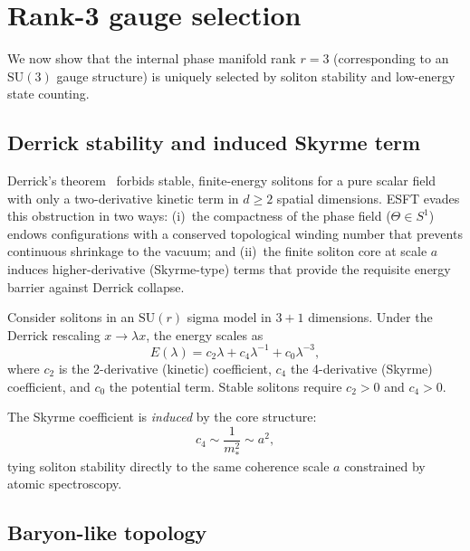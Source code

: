 ﻿\documentclass[a4paper,12pt]{article}
\begin{document}
\section{Rank-3 gauge selection}
\label{sec:rank3}

We now show that the internal phase manifold rank $r=3$ (corresponding
to an $\mathrm{SU}(3)$ gauge structure) is uniquely selected by soliton
stability and low-energy state counting.

\subsection{Derrick stability and induced Skyrme term}

Derrick's theorem~\cite{Derrick1964} forbids stable, finite-energy solitons for a pure scalar field with only a two-derivative kinetic term in $d\geq 2$ spatial dimensions.
ESFT evades this obstruction in two ways: (i)~the compactness of the phase field ($\Theta\in S^1$) endows configurations with a conserved topological winding number that prevents continuous shrinkage to the vacuum; and (ii)~the finite soliton core at scale $a$ induces higher-derivative (Skyrme-type) terms that provide the requisite energy barrier against Derrick collapse.

Consider solitons in an $\mathrm{SU}(r)$ sigma model in $3{+}1$
dimensions.  Under the Derrick rescaling $x\to\lambda x$, the energy
scales as
\begin{equation}
  E(\lambda) = c_2\lambda + c_4\lambda^{-1} + c_0\lambda^{-3},
\end{equation}
where $c_2$ is the 2-derivative (kinetic) coefficient, $c_4$ the
4-derivative (Skyrme) coefficient, and $c_0$ the potential term.
Stable solitons require $c_2>0$ and $c_4>0$.

The Skyrme coefficient is \emph{induced} by the core structure:
\begin{equation}
  c_4 \sim \frac{1}{m_*^2} \sim a^2,
  \label{eq:c4}
\end{equation}
tying soliton stability directly to the same coherence scale $a$
constrained by atomic spectroscopy.

\subsection{Baryon-like topology}
\end{document}
